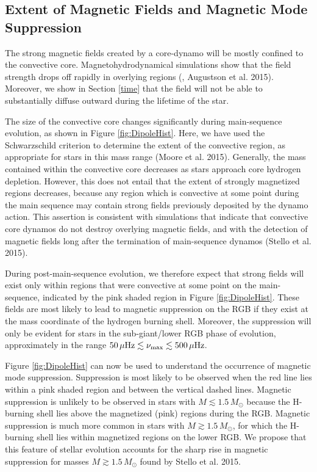 \subsection{Extent of Magnetic Fields and Magnetic Mode Suppression}
\label{rgb}

The strong magnetic fields created by a core-dynamo will be mostly confined to the convective core. Magnetohydrodynamical simulations show that the field strength drops off rapidly in overlying regions (\citealt{Featherstone_2009}, Augustson et al. 2015). Moreover, we show in Section \ref{time} that the field will not be able to substantially diffuse outward during the lifetime of the star. 

The size of the convective core changes significantly during main-sequence evolution, as shown in Figure \ref{fig:DipoleHist}. Here, we have used the Schwarzschild criterion to determine the extent of the convective region, as appropriate for stars in this mass range (Moore et al. 2015). Generally, the mass contained within the convective core decreases as stars approach core hydrogen depletion. However, this does not entail that the extent of strongly magnetized regions decreases, because any region which is convective at some point during the main sequence may contain strong fields previously deposited by the dynamo action. This assertion is consistent with simulations \citep{Featherstone_2009} that indicate that convective core dynamos do not destroy overlying magnetic fields, and with the detection of magnetic fields long after the termination of main-sequence dynamos (Stello et al. 2015).

During post-main-sequence evolution, we therefore expect that strong fields will exist only within regions that were convective at some point on the main-sequence, indicated by the pink shaded region in Figure \ref{fig:DipoleHist}. These fields are most likely to lead to magnetic suppression on the RGB if they exist at the mass coordinate of the hydrogen burning shell. Moreover, the suppression will only be evident for stars in the sub-giant/lower RGB phase of evolution, approximately in the range $50 \, \mu {\rm Hz} \lesssim \nu_{\rm max} \lesssim 500 \, \mu {\rm Hz}$.

Figure \ref{fig:DipoleHist} can now be used to understand the occurrence of magnetic mode suppression. Suppression is most likely to be observed when the red line lies within a pink shaded region and between the vertical dashed lines. Magnetic suppression is unlikely to be observed in stars with $M \lesssim 1.5 \, M_\odot$ because the H-burning shell lies above the magnetized (pink) regions during the RGB. Magnetic suppression is much more common in stars with $M \gtrsim 1.5 \, M_\odot$, for which the H-burning shell lies within magnetized regions on the lower RGB. We propose that this feature of stellar evolution accounts for the sharp rise in magnetic suppression for masses $M \gtrsim 1.5 \, M_\odot$ found by Stello et al. 2015.

    
    
  
  